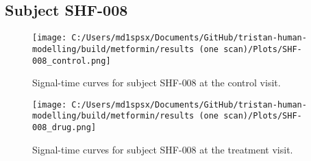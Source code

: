 \documentclass{epflreport}%
\begin{document}
\subsection{Subject SHF{-}008}%
\label{subsec:SubjectSHF{-}008}%

%


\begin{figure}[h!]%
\centering%
\texttt{[image: C:/Users/md1spsx/Documents/GitHub/tristan-human-modelling/build/metformin/results (one scan)/Plots/SHF-008\_control.png]}%
\caption{Signal{-}time curves for subject SHF{-}008 at the control visit.}%
\end{figure}

%


\begin{figure}[h!]%
\centering%
\texttt{[image: C:/Users/md1spsx/Documents/GitHub/tristan-human-modelling/build/metformin/results (one scan)/Plots/SHF-008\_drug.png]}%
\caption{Signal{-}time curves for subject SHF{-}008 at the treatment visit.}%
\end{figure}
\end{document}
